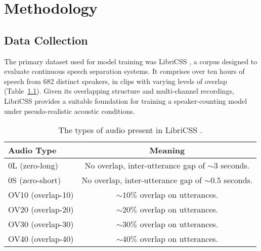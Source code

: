 
\chapter{Methodology}

\section{Data Collection}
\label{sec:data_col}
The primary dataset used for model training was LibriCSS \cite{libricss}, a corpus designed to evaluate continuous speech separation systems. It comprises over ten hours of speech from 682 distinct speakers, in clips with varying levels of overlap (Table~\ref{tab:LibriCSS}). Given its overlapping structure and multi-channel recordings, LibriCSS provides a suitable foundation for training a speaker-counting model under pseudo-realistic acoustic conditions.

\begin{table}[H]
  \centering
  \caption{The types of audio present in LibriCSS \cite{libricss}.}
  \label{tab:LibriCSS}
  \begin{tabular}{|l|c|}
    \hline
    \textbf{Audio Type} & \textbf{Meaning} \\
    \hline
    0L (zero-long) & No overlap, inter-utterance gap of $\sim3$ seconds. \\
    \hline
    0S (zero-short) & No overlap, inter-utterance gap of $\sim0.5$ seconds. \\
    \hline
    OV10 (overlap-10) & $\sim10\%$ overlap on utterances. \\
    \hline
    OV20 (overlap-20) & $\sim20\%$ overlap on utterances. \\
    \hline
    OV30 (overlap-30) & $\sim30\%$ overlap on utterances. \\
    \hline
    OV40 (overlap-40) & $\sim40\%$ overlap on utterances. \\
    \hline
  \end{tabular}
\end{table}

